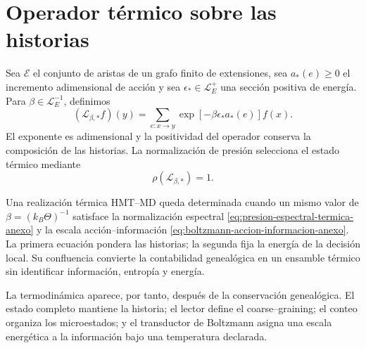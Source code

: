 \section{Operador térmico sobre las historias}

Sea \(\mathcal E\) el conjunto de aristas de un grafo finito de extensiones,
sea \(a_*(e)\geq0\) el incremento adimensional de acción y sea
\(\epsilon_*\in\mathcal L_E^+\) una sección positiva de energía. Para
\(\beta\in\mathcal L_E^{-1}\), definimos
\begin{equation}
 (\mathcal L_{\beta,*}f)(y)
 =\sum_{e:x\to y}
 \exp[-\beta\epsilon_*a_*(e)]f(x).
 \label{eq:operador-transferencia-termica-anexo}
\end{equation}
El exponente es adimensional y la positividad del operador conserva la
composición de las historias. La normalización de presión selecciona el estado
térmico mediante
\begin{equation}
 \boxed{\rho(\mathcal L_{\beta,*})=1.}
 \label{eq:presion-espectral-termica-anexo}
\end{equation}

\begin{proposition}
\label{prop:confluencia-termica-anexo}
Una realización térmica HMT--MD queda determinada cuando un mismo valor de
\(\beta=(k_B\Theta)^{-1}\) satisface la normalización espectral
\eqref{eq:presion-espectral-termica-anexo} y la escala acción--información
\eqref{eq:boltzmann-accion-informacion-anexo}. La primera ecuación pondera las
historias; la segunda fija la energía de la decisión local. Su confluencia
convierte la contabilidad genealógica en un ensamble térmico sin identificar
información, entropía y energía.
\end{proposition}

La termodinámica aparece, por tanto, después de la conservación genealógica.
El estado completo mantiene la historia; el lector define el coarse--graining;
el conteo organiza los microestados; y el transductor de Boltzmann asigna una
escala energética a la información bajo una temperatura declarada.
